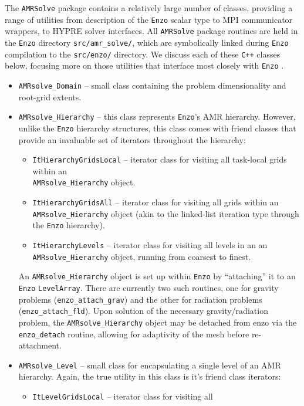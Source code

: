 \documentclass[letterpaper,10pt]{article}
\renewcommand{\(}{\left(}
\renewcommand{\)}{\right)}
\newcommand{\amrsolve}{{\tt AMRSolve} }
\newcommand{\enzo}{{\tt Enzo} }
\newcommand{\cpp}{{\tt C++} }
\begin{document}
The \amrsolve package contains a relatively large number of classes,
providing a range of utilities from description of the \enzo scalar
type to MPI communicator wrappers, to HYPRE solver interfaces.  All
\amrsolve package routines are held in the \enzo directory 
{\tt src/amr\_solve/}, which are symbolically linked during \enzo
compilation to the {\tt src/enzo/} directory.  We discuss each of
these \cpp classes below, focusing more on those utilities that
interface most closely with \enzo.
\begin{itemize}
\item {\tt AMRsolve\_Domain} -- small class containing the problem
  dimensionality and root-grid extents.
\item {\tt AMRsolve\_Hierarchy} -- this class represents {\tt Enzo}'s
  AMR hierarchy.  However, unlike the \enzo hierarchy structures, this
  class comes with friend classes that provide an invaluable set of
  iterators throughout the hierarchy:
  \begin{itemize}
  \item {\tt ItHierarchyGridsLocal} -- iterator class for visiting all
    task-local grids within an \\
    {\tt AMRsolve\_Hierarchy} object.
  \item {\tt ItHierarchyGridsAll} -- iterator class for visiting all
    grids within an {\tt AMRsolve\_Hierarchy} object (akin to the
    linked-list iteration type through the \enzo hierarchy).
  \item {\tt ItHierarchyLevels} -- iterator class for visiting all
    levels in an an {\tt AMRsolve\_Hierarchy} object, running from
    coarsest to finest.
  \end{itemize}
  An {\tt AMRsolve\_Hierarchy} object is set up within \enzo by
  ``attaching'' it to an \enzo {\tt LevelArray}.  There are currently
  two such routines, one for gravity problems 
  ({\tt enzo\_attach\_grav}) and the other for radiation problems 
  ({\tt enzo\_attach\_fld}).  Upon solution of the necessary
  gravity/radiation problem, the {\tt AMRsolve\_Hierarchy} object may
  be detached from enzo via the {\tt enzo\_detach} routine, allowing
  for adaptivity of the mesh before re-attachment.
\item {\tt AMRsolve\_Level} -- small class for encapsulating a single
  level of an AMR hierarchy.  Again, the true utility in this class is
  it's friend class iterators:
  \begin{itemize}
  \item {\tt ItLevelGridsLocal} -- iterator class for visiting all

\end{itemize}
\end{itemize}
\end{document}
